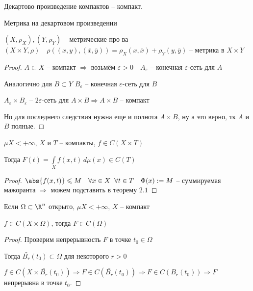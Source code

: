 

\begin{lemma}
	
	Декартово произведение компактов -- компакт. 
	
\end{lemma}

\begin{remark}
	
	Метрика на декартовом произведении 
	
	$(X, \rho_X), (Y, \rho_Y)$ -- метрические про-ва $(X\times Y, \rho) \quad \rho((x, y), (\bar{x}, \bar{y})) = \rho_X(x, \bar{x}) + \rho_Y(y, \bar{y})$ -- метрика в $X\times Y$	
	
\end{remark}

\begin{proof}\thmslashn
	
	
	$A\subset X$ -- компакт $\Rightarrow$ возьмём $\varepsilon > 0 \quad A_\varepsilon$ -- конечная $\varepsilon$-сеть для $A$
	
	Аналогично для $B\subset Y$ $B_\varepsilon$ -- конечная $\varepsilon$-сеть для $B$
	
	$A_\varepsilon \times B_\varepsilon$ -- $2\varepsilon$-сеть для $A\times B \Rightarrow A\times B$ -- компакт
	
	Но для последнего следствия нужна еще и полнота $A\times B$, ну а это верно, тк $A$ и $B$ полные.
	
\end{proof}

\begin{theorem}\thmslashn
	
	$\mu X < +\infty$, $X$ и $T$ -- компакты, $f \in C(X\times T)$
	
	Тогда $F(t) = \int\limits_{X} f(x, t) \,d\mu (x) \in C(T)$
	
\end{theorem}

\begin{proof}\thmslashn
	
	$\abs{f(x, t)}\leqslant M \quad \forall x \in X \;\;\forall t \in T \quad \Phi(x):= M$ -- суммируемая мажоранта $\Rightarrow$ можем подставить в теорему $2.1$
	
\end{proof}

\begin{consequence}\thmslashn
	
	Если $\Omega \subset \R^n$ открыто, $\mu X < +\infty$, $X$ -- компакт
	
	$f\in C(X\times\Omega)$, тогда $F \in C(\Omega)$
	
\end{consequence}

\begin{proof}\thmslashn
	
	Проверим непрерывность $F$ в точке $t_0 \in \Omega$
	
	Тогда $\bar{B_r}(t_0) \subset \Omega$ для некоторого $r > 0$
	
	$f\in C(X \times \bar{B_r}(t_0)) \Rightarrow F \in C(\bar{B_r}(t_0)) \Rightarrow F\in C(B_r(t_0)) \Rightarrow F$ непрерывна в точке $t_0$.
	
\end{proof}
